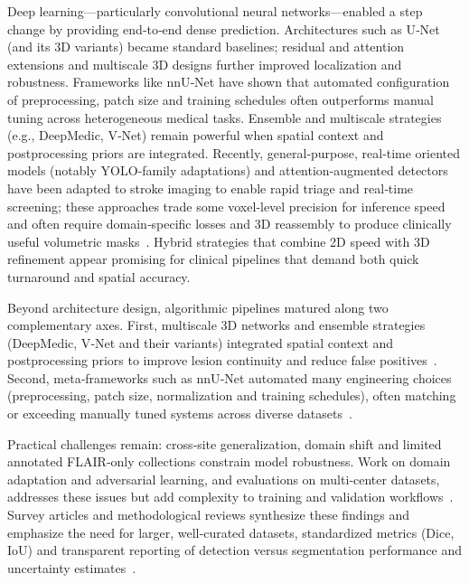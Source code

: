 \documentclass[12pt]{article}
\begin{document}
Deep learning—particularly convolutional neural networks—enabled a step change by providing end‑to‑end dense prediction. Architectures such as U‑Net (and its 3D variants) became standard baselines; residual and attention extensions and multiscale 3D designs further improved localization and robustness. Frameworks like nnU‑Net have shown that automated configuration of preprocessing, patch size and training schedules often outperforms manual tuning across heterogeneous medical tasks. Ensemble and multiscale strategies (e.g., DeepMedic, V‑Net) remain powerful when spatial context and postprocessing priors are integrated. Recently, general‑purpose, real‑time oriented models (notably YOLO‑family adaptations) and attention‑augmented detectors have been adapted to stroke imaging to enable rapid triage and real‑time screening; these approaches trade some voxel‑level precision for inference speed and often require domain‑specific losses and 3D reassembly to produce clinically useful volumetric masks~\cite{chenAutomaticDetectionStroke2022,chenMSAYOLOv5MultiscaleAttentionbased2023,gheibiCNNResDeepLearning2023}. Hybrid strategies that combine 2D speed with 3D refinement appear promising for clinical pipelines that demand both quick turnaround and spatial accuracy. 

Beyond architecture design, algorithmic pipelines matured along two complementary axes. First, multiscale 3D networks and ensemble strategies (DeepMedic, V‑Net and their variants) integrated spatial context and postprocessing priors to improve lesion continuity and reduce false positives~\cite{kamnitsasEfficientMultiscale3D2017,Milletari2016,liFullyConvolutionalNetwork2018}. Second, meta‑frameworks such as nnU‑Net automated many engineering choices (preprocessing, patch size, normalization and training schedules), often matching or exceeding manually tuned systems across diverse datasets~\cite{Isensee2021,isenseeAbstractNnUNetSelfadapting2019}.

Practical challenges remain: cross‑site generalization, domain shift and limited annotated FLAIR‑only collections constrain model robustness. Work on domain adaptation and adversarial learning, and evaluations on multi‑center datasets, addresses these issues but add complexity to training and validation workflows~\cite{Kamnitsas2017DA,Karani2018}. Survey articles and methodological reviews synthesize these findings and emphasize the need for larger, well‑curated datasets, standardized metrics (Dice, IoU) and transparent reporting of detection versus segmentation performance and uncertainty estimates~\cite{Litjens2017,minaeeImageSegmentationUsing2021,liuReviewDeepLearningBasedMedical2021,TahaHanbury2015}.
\end{document}
